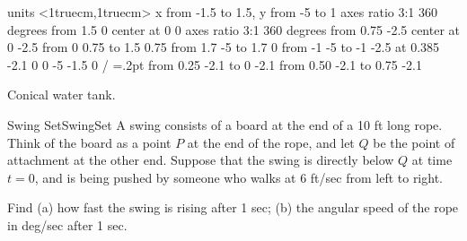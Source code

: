 \figure[H]
\centerline{\vbox{\beginpicture
\normalgraphs
\setcoordinatesystem units <1truecm,1truecm>
\setplotarea x from -1.5 to 1.5, y from -5 to 1
\ellipticalarc  axes ratio 3:1  360 degrees from 1.5 0 center at 0 0
\ellipticalarc  axes ratio 3:1  360 degrees from 0.75 -2.5 center at 0 -2.5
 from 0 0.75 to 1.5 0.75
 from 1.7 -5 to 1.7 0
 from -1 -5 to -1 -2.5
 at 0.385 -2.1
\setlinear
{} 0 0 -5 -1.5 0 /
\plotsymbolspacing=.2pt
\arrow <2pt> [0.7, 2] from 0.25 -2.1 to 0 -2.1
\arrow <2pt> [0.7, 2] from 0.50 -2.1 to 0.75 -2.1
\endpicture}}
\caption{Conical water tank. \label{fig:cone tank}}
\endfigure

\begin{example}{Swing Set}{SwingSet}
A swing consists of a board at the end of a 10 ft long rope.  Think of the
board as a point $P$ at the end of the rope, and let $Q$ be the point of
attachment at the other end.  Suppose that the swing is directly below $Q$
at time $t=0$, and is being pushed by someone who walks at 6
ft/sec from left to right.  

Find (a) how fast the swing is rising after 1
sec; (b) the angular speed of the rope in deg/sec after 1 sec.
\end{example}

